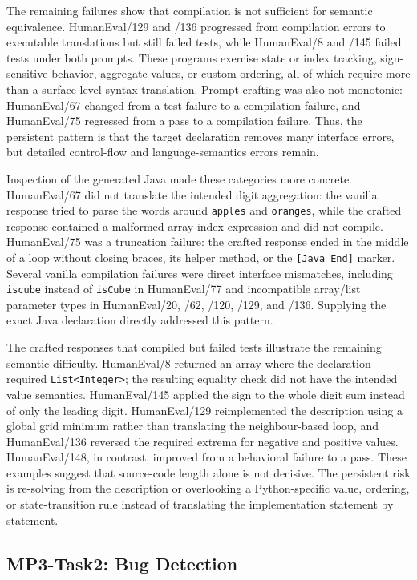 \documentclass[sigconf,nonacm]{acmart}
\begin{document}
The remaining failures show that compilation is not sufficient for semantic
equivalence. HumanEval/129 and /136 progressed from compilation errors to
executable translations but still failed tests, while HumanEval/8 and /145
failed tests under both prompts. These programs exercise state or index
tracking, sign-sensitive behavior, aggregate values, or custom ordering, all of
which require more than a surface-level syntax translation. Prompt crafting was
also not monotonic: HumanEval/67 changed from a test failure to a compilation
failure, and HumanEval/75 regressed from a pass to a compilation failure. Thus,
the persistent pattern is that the target declaration removes many interface
errors, but detailed control-flow and language-semantics errors remain.

Inspection of the generated Java made these categories more concrete.
HumanEval/67 did not translate the intended digit aggregation: the vanilla
response tried to parse the words around \texttt{apples} and \texttt{oranges},
while the crafted response contained a malformed array-index expression and
did not compile. HumanEval/75 was a truncation failure: the crafted response
ended in the middle of a loop without closing braces, its helper method, or the
\texttt{[Java End]} marker. Several vanilla compilation failures were direct
interface mismatches, including \texttt{iscube} instead of \texttt{isCube} in
HumanEval/77 and incompatible array/list parameter types in HumanEval/20, /62,
/120, /129, and /136. Supplying the exact Java declaration directly addressed
this pattern.

The crafted responses that compiled but failed tests illustrate the remaining
semantic difficulty. HumanEval/8 returned an array where the declaration
required \texttt{List<Integer>}; the resulting equality check did not have the
intended value semantics. HumanEval/145 applied the sign to the whole digit sum
instead of only the leading digit. HumanEval/129 reimplemented the description
using a global grid minimum rather than translating the neighbour-based loop,
and HumanEval/136 reversed the required extrema for negative and positive
values. HumanEval/148, in contrast, improved from a behavioral failure to a
pass. These examples suggest that source-code length alone is not decisive.
The persistent risk is re-solving from the description or overlooking a
Python-specific value, ordering, or state-transition rule instead of
translating the implementation statement by statement.

\subsection{MP3-Task2: Bug Detection}
\end{document}
